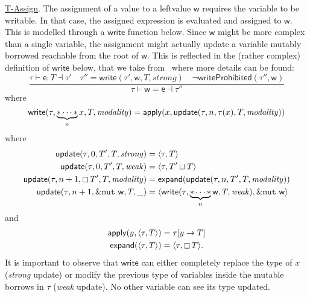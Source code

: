 \underline{\textsf{T-Assign}}.
The assignment of a value to a leftvalue $\mathsf{w}$ requires the variable to be writable.
In that case, the assigned expression is evaluated and assigned to $\mathsf{w}$.
This is modelled through a $\mathsf{write}$ function below.
Since $\mathsf{w}$ might be more complex than a single variable, the assignment might actually
update a variable mutably borrowed reachable from the root of $\mathsf{w}$. This is reflected
in the (rather complex) definition of $\mathsf{write}$ below, that we take from~\cite{Pearce21}
where more details can be found:
\[
\frac
    {\tau\vdash\mathsf{e}:T\dashv\tau' \quad
      \tau''=\mathsf{write}(\tau',\mathsf{w},T,\mathit{strong}) \quad
      \neg\mathsf{writeProhibited}(\tau'',\mathsf{w})}
    {\tau\vdash\mathsf{w}=\mathsf{e}\dashv\tau''}
\]
where
\[
\mathsf{write}(\tau,\underbrace{\mathtt{*}\cdots\mathtt{*}}_nx,T,\mathit{modality})=\mathsf{apply}
(x,\mathsf{update}(\tau,n,\tau(x),T,\mathit{modality}))
\]
%
where
%
\begin{align*}
  \mathsf{update}(\tau,0,T',T,\mathit{strong})&=\langle\tau,T\rangle\\
  \mathsf{update}(\tau,0,T',T,\mathit{weak})&=\langle\tau,T'\sqcup T\rangle\\
  \mathsf{update}(\tau,n+1,\boxempty\,{T'},T,\mathit{modality})
  &=\mathsf{expand}(\mathsf{update}(\tau,n,T',T,\mathit{modality}))\\
  \mathsf{update}(\tau,n+1,\&\mathtt{mut}\ \mathsf{w},T,\_)&=
  \langle\mathsf{write}(\tau,\underbrace{\mathtt{*}\cdots\mathtt{*}}_n\mathsf{w},T,\mathit{weak}),
  \&\mathtt{mut}\ \mathsf{w}\rangle
\end{align*}
and
\begin{align*}
  \mathsf{apply}(y,\langle\tau,T\rangle)&=\tau[y\to T]\\
  \mathsf{expand}(\langle\tau,T\rangle)&=\langle\tau,\boxempty\,{T}\rangle.
\end{align*}
%
\noindent
It is important to observe that $\mathsf{write}$
can either completely replace the type of $x$
(\emph{strong} update) or modify the previous type of variables
inside the mutable borrows in $\tau$ (\emph{weak} update).
No other variable can see its type updated.

